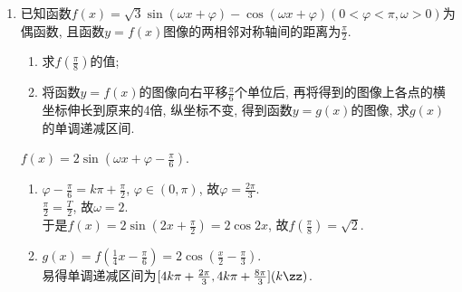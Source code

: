 \begin{enumerate}
\begin{enumerate}[(1)]
\item 若$\cos\frac{\pi}{4}\cos\varphi-\sin\frac{3\pi}{4}\sin\varphi=0$, 求$\varphi$的值; 
\item 在(1)的条件下, 若函数$f(x)$的图像的相邻两条对称轴之间的距离等于$\frac{\pi}{3}$, 求函数$f(x)$的解析式; 
并求最小正实数$m$, 使得函数$f(x)$的图像象左平移$m$个单位所对应的函数是偶函数. 
\end{enumerate}
\begin{jieda}
\begin{enumerate}[(1)]
\item $\cos(\varphi+\frac{\pi}{4})=0$, $\varphi\in(-\frac{\pi}{4},\frac{\pi}{4})$, 故$\varphi=\frac{\pi}{4}$. 
\item $\frac{\pi}{3}=\frac{T}{2}$, 故$\omega=3$. \\
于是$f(x)=\sin(3x+\frac{\pi}{4})$. \\
$3m+\frac{\pi}{4}=k\pi+\frac{\pi}{2}$, 故$m=\frac{k\pi}{3}+\frac{\pi}{12}$, 故$m_{\min}=\frac{\pi}{12}$. 
\end{enumerate}
\end{jieda}
\item 已知函数$f(x)=\sqrt{3}\sin(\omega{x}+\varphi)-\cos(\omega{x}+\varphi)(0<\varphi<\pi, \omega >0)$为偶函数, 
且函数$y=f(x)$图像的两相邻对称轴间的距离为$\frac{\pi}{2}$. 
\begin{enumerate}[(1)]
\item 求$f(\frac{\pi}{8})$的值; 
\item 将函数$y=f(x)$的图像向右平移$\frac{\pi}{6}$个单位后, 再将得到的图像上各点的横坐标伸长到原来的4倍, 纵坐标不变, 得到函数$y=g(x)$的图像, 求$g(x)$的单调递减区间. 
\end{enumerate}
\begin{jieda}
$f(x)=2\sin(\omega{x}+\varphi-\frac{\pi}{6})$. 
\begin{enumerate}[(1)]
\item $\varphi-\frac{\pi}{6}=k\pi+\frac{\pi}{2}$, $\varphi\in(0,\pi)$, 故$\varphi=\frac{2\pi}{3}$. \\
$\frac{\pi}{2}=\frac{T}{2}$, 故$\omega=2$. \\
于是$f(x)=2\sin(2x+\frac{\pi}{2})=2\cos2x$, 故$f(\frac{\pi}{8})=\sqrt{2}$. 

\item $g(x)=f(\frac{1}{4}x-\frac{\pi}{6})=2\cos(\frac{x}{2}-\frac{\pi}{3})$. \\
易得单调递减区间为$[4k\pi+\frac{2\pi}{3},4k\pi+\frac{8\pi}{3}](k\zz)$. 
\end{enumerate}
\end{jieda}


\end{enumerate}
